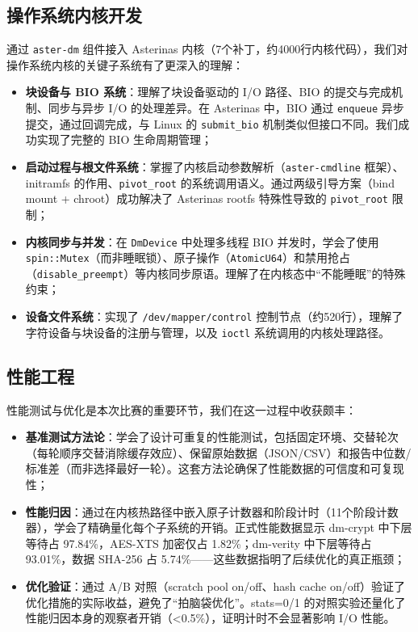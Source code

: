 \subsection{操作系统内核开发}

通过 \texttt{aster-dm} 组件接入 Asterinas 内核（7个补丁，约4000行内核代码），我们对操作系统内核的关键子系统有了更深入的理解：

\begin{itemize}
    \item \textbf{块设备与 BIO 系统}：理解了块设备驱动的 I/O 路径、BIO 的提交与完成机制、同步与异步 I/O 的处理差异。在 Asterinas 中，BIO 通过 \texttt{enqueue} 异步提交，通过回调完成，与 Linux 的 \texttt{submit\_bio} 机制类似但接口不同。我们成功实现了完整的 BIO 生命周期管理；
    \item \textbf{启动过程与根文件系统}：掌握了内核启动参数解析（\texttt{aster-cmdline} 框架）、initramfs 的作用、\texttt{pivot\_root} 的系统调用语义。通过两级引导方案（bind mount + chroot）成功解决了 Asterinas rootfs 特殊性导致的 \texttt{pivot\_root} 限制；
    \item \textbf{内核同步与并发}：在 \texttt{DmDevice} 中处理多线程 BIO 并发时，学会了使用 \texttt{spin::Mutex}（而非睡眠锁）、原子操作（\texttt{AtomicU64}）和禁用抢占（\texttt{disable\_preempt}）等内核同步原语。理解了在内核态中“不能睡眠”的特殊约束；
    \item \textbf{设备文件系统}：实现了 \texttt{/dev/mapper/control} 控制节点（约520行），理解了字符设备与块设备的注册与管理，以及 \texttt{ioctl} 系统调用的内核处理路径。
\end{itemize}

\subsection{性能工程}

性能测试与优化是本次比赛的重要环节，我们在这一过程中收获颇丰：

\begin{itemize}
    \item \textbf{基准测试方法论}：学会了设计可重复的性能测试，包括固定环境、交替轮次（每轮顺序交替消除缓存效应）、保留原始数据（JSON/CSV）和报告中位数/标准差（而非选择最好一轮）。这套方法论确保了性能数据的可信度和可复现性；
    \item \textbf{性能归因}：通过在内核热路径中嵌入原子计数器和阶段计时（11个阶段计数器），学会了精确量化每个子系统的开销。正式性能数据显示 dm-crypt 中下层等待占 97.84\%，AES-XTS 加密仅占 1.82\%；dm-verity 中下层等待占 93.01\%，数据 SHA-256 占 5.74\%——这些数据指明了后续优化的真正瓶颈；
    \item \textbf{优化验证}：通过 A/B 对照（scratch pool on/off、hash cache on/off）验证了优化措施的实际收益，避免了“拍脑袋优化”。stats=0/1 的对照实验还量化了性能归因本身的观察者开销（<0.5\%），证明计时不会显著影响 I/O 性能。
\end{itemize}


